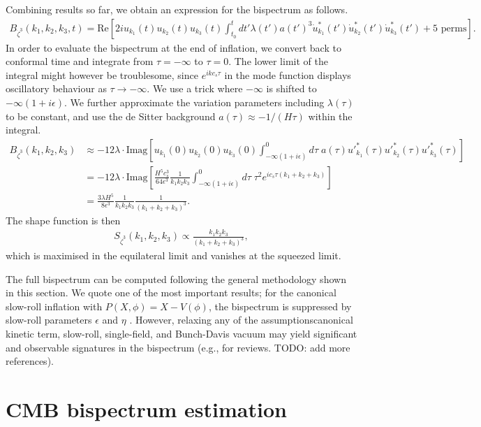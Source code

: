Combining results so far, we obtain an expression for the bispectrum as follows.
\begin{align}
	B_{\dot{\zeta}^3}(k_1,k_2,k_3,t) = \text{Re}\left[ 2i u_{k_1}(t) u_{k_2}(t) u_{k_3}(t) \int_{t_0}^{t} dt' \lambda(t') a(t')^3 \dot{u}^*_{k_1}(t') \dot{u}^*_{k_2}(t') \dot{u}^*_{k_3}(t')   + \text{5 perms} \right].
\end{align}
In order to evaluate the bispectrum at the end of inflation, we convert back to conformal time and integrate from $\tau=-\infty$ to $\tau=0$. The lower limit of the integral might however be troublesome, since $e^{i k c_s \tau}$ in the mode function displays oscillatory behaviour as $\tau\rightarrow -\infty$. We use a trick where $-\infty$ is shifted to $-\infty(1+i\epsilon)$. We further approximate the variation parameters including $\lambda(\tau)$ to be constant, and use the de Sitter background $a(\tau)\approx -1/(H\tau)$ within the integral. 
\begin{align}
	B_{\dot{\zeta}^3}(k_1,k_2,k_3) &\approx -12\lambda \cdot \text{Imag}\left[  u_{k_1}(0) u_{k_2}(0) u_{k_3}(0) \int_{-\infty(1+i\epsilon)}^{0} d\tau \;  a(\tau) {u'}^*_{k_1}(\tau) {u'}^*_{k_2}(\tau) {u'}^*_{k_3}(\tau)  \right] \\
	&= -12\lambda \cdot \text{Imag} \left[ \frac{H^5 c_s^3}{64\epsilon^3} \frac{1}{k_1 k_2 k_3} \int_{-\infty(1+i\epsilon)}^{0} d\tau \; \tau^2 e^{ic_s\tau(k_1+k_2+k_3)} \right] \\
	&= \frac{3\lambda H^5}{8\epsilon^3} \frac{1}{k_1 k_2 k_3} \frac{1}{(k_1+k_2+k_3)^3}.
\end{align}
The shape function is then
\begin{align}
	S_{\dot{\zeta}^3}(k_1,k_2,k_3) \propto \frac{k_1 k_2 k_3}{(k_1+k_2+k_3)^3},
\end{align}
which is maximised in the equilateral limit and vanishes at the squeezed limit.

The full bispectrum can be computed following the general methodology shown in this section. We quote one of the most important results; for the canonical slow-roll inflation with $P(X,\phi) = X - V(\phi)$, the bispectrum is suppressed by slow-roll parameters $\epsilon$ and $\eta$ \cite{Maldacena2013}. However, relaxing any of the assumptions\textemdash canonical kinetic term, slow-roll, single-field, and Bunch-Davis vacuum \textemdash may yield significant and observable signatures in the bispectrum (e.g., \cite{Chen2010,Komatsu2010} for reviews. TODO: add more references).

\section{CMB bispectrum estimation} \label{section:CMB_bispectrum_estimation}

